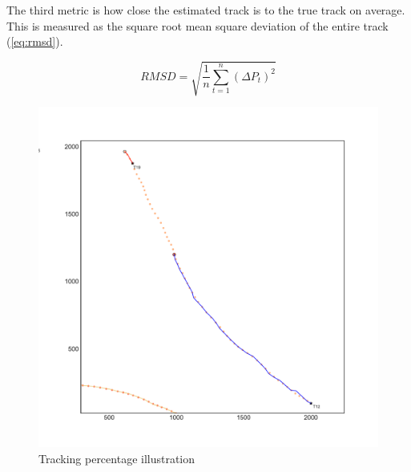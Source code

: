 The third metric is how close the estimated track is to the true track on average. This is measured as the square root mean square deviation of the entire track (\ref{eq:rmsd}).

\begin{equation}\label{eq:rmsd}
RMSD = \sqrt{\frac{1}{n}\sum_{t=1}^{n}{(\Delta P_t)}^2}
\end{equation}
\begin{figure}
\centering
\includegraphics[width = .8\textwidth]{Figures/track_percentage_illustration.pdf}
\caption{Tracking percentage illustration}\label{fig:track_percentage}
\end{figure}

